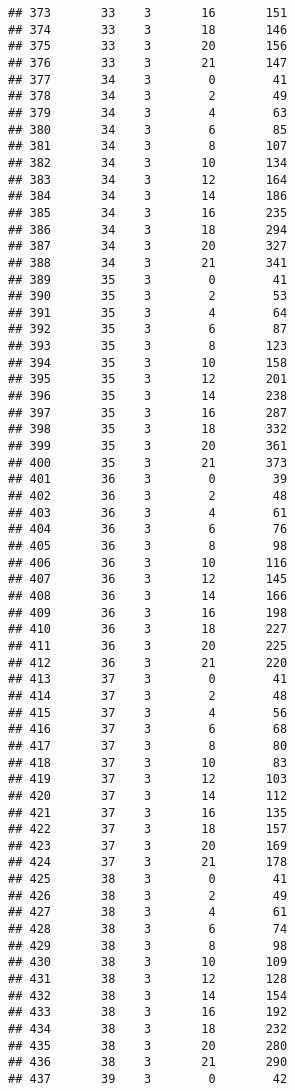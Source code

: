 \documentclass[
]{article}
\begin{document}
\begin{verbatim}
## 373       33    3       16       151
## 374       33    3       18       146
## 375       33    3       20       156
## 376       33    3       21       147
## 377       34    3        0        41
## 378       34    3        2        49
## 379       34    3        4        63
## 380       34    3        6        85
## 381       34    3        8       107
## 382       34    3       10       134
## 383       34    3       12       164
## 384       34    3       14       186
## 385       34    3       16       235
## 386       34    3       18       294
## 387       34    3       20       327
## 388       34    3       21       341
## 389       35    3        0        41
## 390       35    3        2        53
## 391       35    3        4        64
## 392       35    3        6        87
## 393       35    3        8       123
## 394       35    3       10       158
## 395       35    3       12       201
## 396       35    3       14       238
## 397       35    3       16       287
## 398       35    3       18       332
## 399       35    3       20       361
## 400       35    3       21       373
## 401       36    3        0        39
## 402       36    3        2        48
## 403       36    3        4        61
## 404       36    3        6        76
## 405       36    3        8        98
## 406       36    3       10       116
## 407       36    3       12       145
## 408       36    3       14       166
## 409       36    3       16       198
## 410       36    3       18       227
## 411       36    3       20       225
## 412       36    3       21       220
## 413       37    3        0        41
## 414       37    3        2        48
## 415       37    3        4        56
## 416       37    3        6        68
## 417       37    3        8        80
## 418       37    3       10        83
## 419       37    3       12       103
## 420       37    3       14       112
## 421       37    3       16       135
## 422       37    3       18       157
## 423       37    3       20       169
## 424       37    3       21       178
## 425       38    3        0        41
## 426       38    3        2        49
## 427       38    3        4        61
## 428       38    3        6        74
## 429       38    3        8        98
## 430       38    3       10       109
## 431       38    3       12       128
## 432       38    3       14       154
## 433       38    3       16       192
## 434       38    3       18       232
## 435       38    3       20       280
## 436       38    3       21       290
## 437       39    3        0        42

\end{verbatim}
\end{document}
